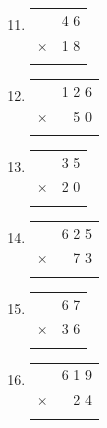\documentclass[11pt, a4paper]{article}
\begin{document}
\begin{enumerate}[label=\arabic*.]
    \setcounter{enumi}{10}
    \item \begin{tabular}{c r}
          & 4 6 \\
        $\times$ & 1 8 \\ \hline
          & \\ \hline
    \end{tabular}
    \hfill
    \setcounter{enumi}{15}
    \item \begin{tabular}{c r}
          & 1 2 6 \\
        $\times$ & 5 0 \\ \hline
          & \\ \hline
    \end{tabular}

    \vspace{1.5cm}
    \setcounter{enumi}{11}
    \item \begin{tabular}{c r}
          & 3 5 \\
        $\times$ & 2 0 \\ \hline
          & \\ \hline
    \end{tabular}
    \hfill
    \setcounter{enumi}{16}
    \item \begin{tabular}{c r}
          & 6 2 5 \\
        $\times$ & 7 3 \\ \hline
          & \\ \hline
    \end{tabular}

    \vspace{1.5cm}
    \setcounter{enumi}{12}
    \item \begin{tabular}{c r}
          & 6 7 \\
        $\times$ & 3 6 \\ \hline
          & \\ \hline
    \end{tabular}
    \hfill
    \setcounter{enumi}{17}
    \item \begin{tabular}{c r}
          & 6 1 9 \\
        $\times$ & 2 4 \\ \hline
          & \\ \hline
    \end{tabular}


\end{enumerate}
\end{document}
